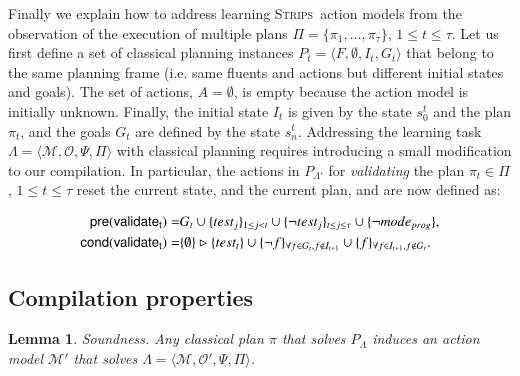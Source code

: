 \documentclass[3p,times]{elsarticle}
\newtheorem{mylemma}[mytheorem]{Lemma}
\newcommand{\pre}{\mathsf{pre}}  %
\newcommand{\cond}{\mathsf{cond}}   %
\newcommand{\strips}{\textsc{Strips}}     %
\newcommand{\tup}[1]{{\langle #1 \rangle}}
\begin{document}
Finally we explain how to address learning \strips\ action models from the observation of the execution of multiple plans $\Pi=\{\pi_1,\ldots,\pi_{\tau}\}$, {\tt\small $1\leq t\leq \tau$}. Let us first define a set of classical planning instances $P_t=\tup{F,\emptyset,I_t,G_t}$ that belong to the same planning frame (i.e. same fluents and actions but different initial states and goals). The set of actions, $A=\emptyset$, is empty because the action model is initially unknown. Finally, the initial state $I_t$ is given by the state $s_0^t$ and the plan $\pi_t$, and the goals $G_t$ are defined by the state $s_n^t$. Addressing the learning task $\Lambda=\tup{\mathcal{M},\mathcal{O},\Psi,\Pi}$ with classical planning requires introducing a small modification to our compilation. In particular, the actions in $P_{\Lambda'}$ for {\em validating} the plan $\pi_t\in\Pi$, {\tt\small $1\leq t\leq \tau$} reset the current state, and the current plan, and are now defined as:
\begin{small}
\begin{align*}
\hspace*{7pt}\pre(\mathsf{validate_{t}})=&G_t\cup\{test_j\}_{1\leq j<t}\cup\{\neg test_j\}_{t\leq j\leq \tau}\cup \{\neg mode_{prog}\},\\
\cond(\mathsf{validate_{t}})=&\{\emptyset\}\rhd\{test_t\} \cup \{\neg f\}_{\forall f\in G_t, f \notin I_{t+1}}\cup \{f\}_{\forall f\in I_{t+1}, f \notin G_t}.
\end{align*}
\end{small}


\subsection{Compilation properties}

\begin{mylemma}
Soundness. Any classical plan $\pi$ that solves $P_{\Lambda}$ induces an action model $\mathcal{M}'$ that solves $\Lambda=\tup{\mathcal{M},\mathcal{O}',\Psi,\Pi}$.
\end{mylemma}
\end{document}
